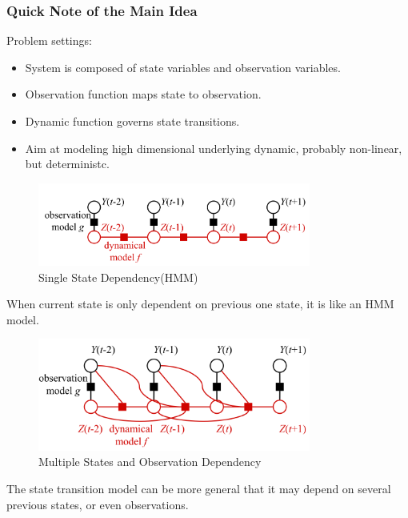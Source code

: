\documentclass[11pt,a4paper]{article}
\begin{document}
\subsubsection{Quick Note of the Main Idea}

Problem settings:
\begin{itemize}
	\item System is composed of state variables and observation 
	variables. 
	\item Observation function maps state to observation. 
	\item Dynamic function governs state transitions. 
	\item Aim at modeling high dimensional underlying dynamic, 
	probably non-linear, but deterministc. 
\end{itemize}

\begin{figure}[htb]
\centering
	\includegraphics[width=0.8\textwidth]{fig/mirowski2009-HMM.png}
	\caption{Single State Dependency(HMM)}
\end{figure}	

When current state is only dependent on previous one state, it
is like an HMM model. 

\begin{figure}[htb]
\centering
	\includegraphics[width=0.8\textwidth]{fig/mirowski2009-framework.png}
	\caption{Multiple States and Observation Dependency}
\end{figure}

The state transition model can be more general that it may depend
on several previous states, or even observations. 
\end{document}
